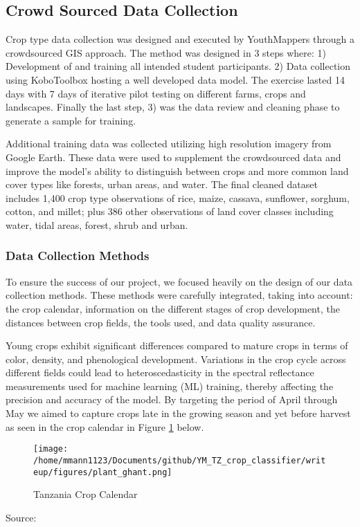 \documentclass[journal]{IEEEtran}
\begin{document}
\subsection{Crowd Sourced Data Collection}
Crop type data collection was designed and executed by YouthMappers through a crowdsourced GIS approach. The method was designed in 3 steps where: 1) Development of and training all intended student participants. 2) Data collection using KoboToolbox hosting a well developed data model. The exercise lasted 14 days with 7 days of iterative pilot testing on different farms, crops and landscapes. Finally the last step, 3) was the data review and cleaning phase to generate a sample for training.

Additional training data was collected utilizing high resolution imagery from Google Earth. These data were used to supplement the crowdsourced data and improve the model's ability to distinguish between crops and more common land cover types like forests, urban areas, and water.  The final cleaned dataset includes 1,400 crop type observations of rice, maize, cassava, sunflower, sorghum, cotton, and millet; plus 386 other observations of land cover classes including water, tidal areas, forest, shrub and urban.  

\subsubsection{Data Collection Methods}

To ensure the success of our project, we focused heavily on the design of our data collection methods. These methods were carefully integrated, taking into account: the crop calendar, information on the different stages of crop development, the distances between crop fields, the tools used, and data quality assurance.

Young crops exhibit significant differences compared to mature crops in terms of color, density, and phenological development. Variations in the crop cycle across different fields could lead to heteroscedasticity in the spectral reflectance measurements used for machine learning (ML) training, thereby affecting the precision and accuracy of the model. By targeting the period of April through May we aimed to capture crops late in the growing season and yet before harvest as seen in the crop calendar in Figure \ref{fig:crop_cal} below.

\begin{figure}[!t] 
   \centering   \texttt{[image: /home/mmann1123/Documents/github/YM\_TZ\_crop\_classifier/writeup/figures/plant\_ghant.png]}
   \caption{Tanzania Crop Calendar }
   \label{fig:crop_cal} %
\end{figure} Source: \cite{cc_tanzania}
\end{document}
